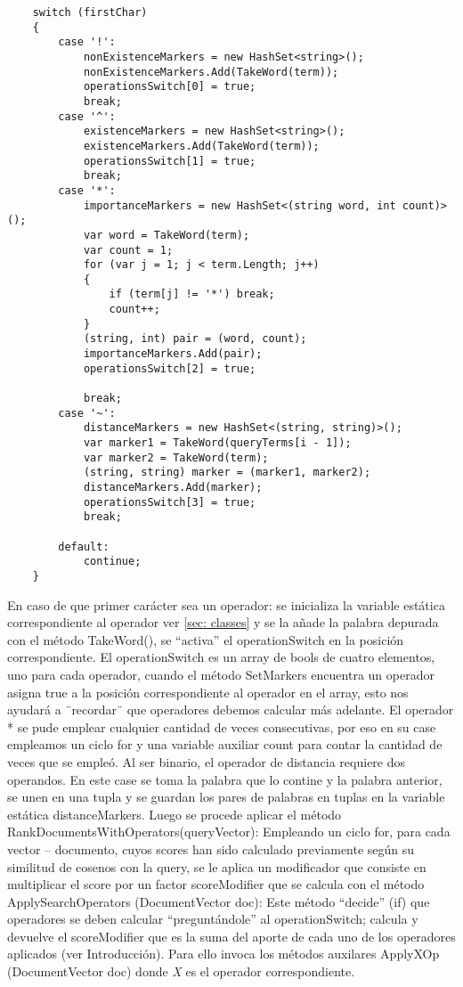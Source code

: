 \documentclass[a4paper,12pt,twocolumn]{article}
\begin{document}
\begin{enumerate}
\begin{verbatim}
    switch (firstChar)
    {
        case '!':
            nonExistenceMarkers = new HashSet<string>();
            nonExistenceMarkers.Add(TakeWord(term));
            operationsSwitch[0] = true;
            break;
        case '^':
            existenceMarkers = new HashSet<string>();
            existenceMarkers.Add(TakeWord(term));
            operationsSwitch[1] = true;
            break;
        case '*':
            importanceMarkers = new HashSet<(string word, int count)>();
            var word = TakeWord(term);
            var count = 1;
            for (var j = 1; j < term.Length; j++)
            {
                if (term[j] != '*') break;
                count++;
            }
            (string, int) pair = (word, count);
            importanceMarkers.Add(pair);
            operationsSwitch[2] = true;

            break;
        case '~':
            distanceMarkers = new HashSet<(string, string)>();
            var marker1 = TakeWord(queryTerms[i - 1]);
            var marker2 = TakeWord(term);
            (string, string) marker = (marker1, marker2);
            distanceMarkers.Add(marker);
            operationsSwitch[3] = true;
            break;  

        default:
            continue;
    }
\end{verbatim}


En caso de que primer carácter sea un operador: se inicializa la variable estática
correspondiente al operador ver \ref{sec: classes} y se la añade la palabra depurada
con el método TakeWord(), se “activa” el operationSwitch en la posición correspondiente.
El operationSwitch es un array de bools de cuatro elementos, uno para cada operador, cuando
el método SetMarkers encuentra un operador asigna true a la posición correspondiente al
operador en el array, esto nos ayudará a ¨recordar¨ que operadores debemos calcular más
adelante.
El operador * se pude emplear cualquier cantidad de veces consecutivas, por eso en su case
empleamos un ciclo for y una variable auxiliar count para contar la cantidad de veces que se
empleó.
Al ser binario, el operador de distancia requiere dos operandos. En este case se toma la palabra
que lo contine y la palabra anterior, se unen en una tupla y se guardan los pares de palabras
en tuplas en la variable estática distanceMarkers.
Luego se procede aplicar el método RankDocumentsWithOperators(queryVector):
Empleando un ciclo for, para cada vector – documento, cuyos scores han sido calculado
previamente según su similitud de cosenos con la query, se le aplica un modificador que
consiste en multiplicar el score por un factor scoreModifier que se calcula con el método
ApplySearchOperators (DocumentVector doc):
Este método “decide” (if) que operadores se deben calcular “preguntándole” al operationSwitch;
calcula y devuelve el scoreModifier que es la suma del aporte de cada uno de los operadores
aplicados (ver Introducción). Para ello invoca los métodos auxilares ApplyXOp
(DocumentVector doc) donde \emph{X} es el operador correspondiente.


\end{enumerate}
\end{document}
